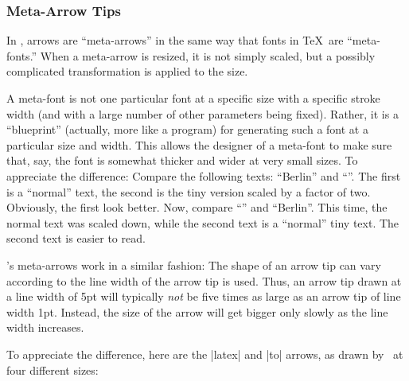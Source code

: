\subsubsection{Meta-Arrow Tips}

In \pgfname, arrows are ``meta-arrows'' in the same way that fonts in
\TeX\ are ``meta-fonts.'' When a meta-arrow is resized, it is not
simply scaled, but a possibly complicated transformation is applied to
the size.

A meta-font is not one particular font at a specific size with a
specific stroke width (and with a large number of other parameters
being fixed). Rather, it is a ``blueprint'' (actually, more like a
program) for generating such a font at a particular size and
width. This allows the designer of a meta-font to make sure that, say,
the font is somewhat thicker and wider at very small sizes. To
appreciate the difference: Compare the following texts: ``Berlin'' and
``''. The first is a ``normal'' text, the second is the tiny
version scaled by a factor of two. Obviously, the first look
better. Now, compare  ``'' and ``{\tiny Berlin}''. This time, the normal
text was scaled down, while the second text is a ``normal'' tiny
text. The second text is easier to read.

\pgfname's meta-arrows work in a similar fashion: The shape of an
arrow tip can vary according to the line width of the arrow tip is
used. Thus, an arrow tip drawn at a line width of 5pt will typically
\emph{not} be five times as large as an arrow tip of line width
1pt. Instead, the size of the arrow will get bigger only slowly as the
line width increases.

To appreciate the difference, here are the |latex| and |to| arrows, as
drawn by \pgfname\ at four different sizes:

\medskip
{}

